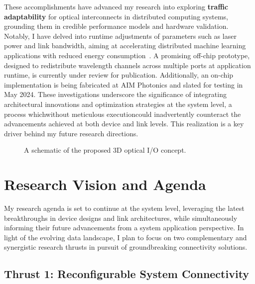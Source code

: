 These accomplishments have advanced my research into exploring \textbf{traffic adaptability} for optical interconnects in distributed computing systems, grounding them in credible performance models and hardware validation. Notably, I have delved into runtime adjustments of parameters such as laser power and link bandwidth, aiming at accelerating distributed machine learning applications with reduced energy consumption~\cite{wangTaskMappingAssistedLaser2019,wangTrafficAdaptivePowerReconfiguration2021,brianJOCN}. A promising off-chip prototype, designed to redistribute wavelength channels across multiple ports at application runtime, is currently under review for publication. Additionally, an on-chip implementation is being fabricated at AIM Photonics and slated for testing in May 2024. These investigations underscore the significance of integrating architectural innovations and optimization strategies at the system level, a process which\textemdash without meticulous execution\textemdash could inadvertently counteract the advancements achieved at both device and link levels. This realization is a key driver behind my future research directions.

\begin{figure}[!t]
    \centering
    \caption{A schematic of the proposed 3D optical I/O concept.}
    \label{fig:research}
\end{figure}

\section{Research Vision and Agenda}
My research agenda is set to continue at the system level, leveraging the latest breakthroughs in device designs and link architectures, while simultaneously informing their future advancements from a system application perspective. In light of the evolving data landscape, I plan to focus on two complementary and synergistic research thrusts in pursuit of groundbreaking connectivity solutions.

\subsection{Thrust 1: Reconfigurable System Connectivity}


